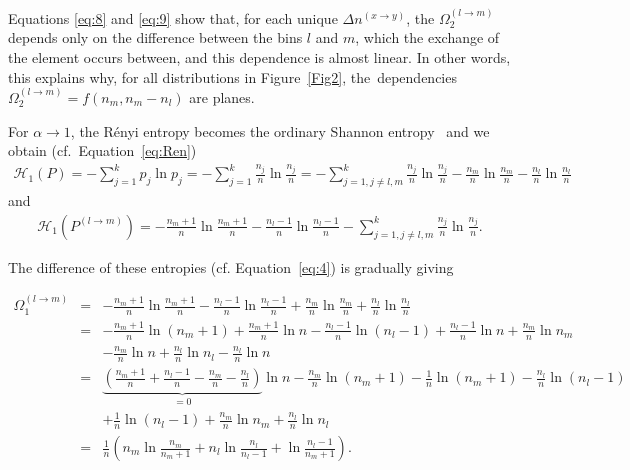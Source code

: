 \documentclass[entropy,article,accept,moreauthors,pdftex,10pt,a4paper]{mdpi}
\begin{document}
Equations \eqref{eq:8} and \eqref{eq:9} show that, for each unique $\Delta n^{(x \rightarrow y)}$, the $\Omega_2^{(l \rightarrow m)}$ depends only on the difference between the bins $l$ and $m$, which the exchange of the element occurs between, and this dependence is almost linear. In other words, this explains why, for all distributions in {Figure}~\ref{Fig2}, the~dependencies $\Omega_2^{(l \rightarrow m)} = f(n_m, n_m-n_l)$ are planes.


For $\alpha \rightarrow 1$, the R\'{e}nyi entropy becomes the ordinary Shannon entropy~\cite{Sh48} and we obtain (cf.~Equation~\eqref{eq:Ren})
\begin{eqnarray}
\mathscr{H}_1(P) = -\sum_{j=1}^{k}p_j\ln p_j = -\sum_{j=1}^{k}\frac{n_j}{n}\ln \frac{n_j}{n} = -\sum_{j=1,j\neq l,m}^{k}\frac{n_j}{n}\ln \frac{n_j}{n} - \frac{n_m}{n}\ln \frac{n_m}{n} - \frac{n_l}{n}\ln \frac{n_l}{n}
\end{eqnarray}
and
\begin{eqnarray}
\mathscr{H}_1(P^{(l \rightarrow m)}) = -\frac{n_m + 1}{n}\ln \frac{n_m + 1}{n} - \frac{n_l - 1}{n}\ln \frac{n_l - 1}{n} -\sum_{j=1,j\neq l,m}^{k}\frac{n_j}{n}\ln \frac{n_j}{n}.
\end{eqnarray}

The difference of these entropies (cf. Equation~\eqref{eq:4}) is gradually giving
\begin{small}\begin{eqnarray}
\label{eq:Sh}
\Omega_1^{(l \rightarrow m)} &=& -\frac{n_m + 1}{n}\ln \frac{n_m + 1}{n} - \frac{n_l - 1}{n}\ln \frac{n_l - 1}{n} + \frac{n_m}{n}\ln \frac{n_m}{n} + \frac{n_l}{n}\ln \frac{n_l}{n} \nonumber \\
&=& -\frac{n_m + 1}{n}\ln (n_m + 1) + \frac{n_m + 1}{n}\ln n - \frac{n_l - 1}{n}\ln (n_l - 1) + \frac{n_l - 1}{n}\ln n + \frac{n_m}{n}\ln n_m \nonumber \\
& & -\frac{n_m}{n}\ln n + \frac{n_l}{n}\ln n_l - \frac{n_l}{n}\ln n \nonumber \\
&=& \underbrace{(\frac{n_m + 1}{n} + \frac{n_l - 1}{n} - \frac{n_m}{n} - \frac{n_l}{n})}_{=0}\ln n - \frac{n_m}{n} \ln (n_m + 1) - \frac{1}{n} \ln (n_m + 1) - \frac{n_l}{n} \ln (n_l - 1) \nonumber \\
& & +\frac{1}{n} \ln (n_l - 1) + \frac{n_m}{n}\ln n_m + \frac{n_l}{n}\ln n_l \nonumber \\
&=& \frac{1}{n}(n_m \ln \frac{n_m}{n_m + 1} + n_l \ln \frac{n_l}{n_l - 1} + \ln \frac{n_l - 1}{n_m + 1}).
\end{eqnarray}\end{small}
\end{document}
